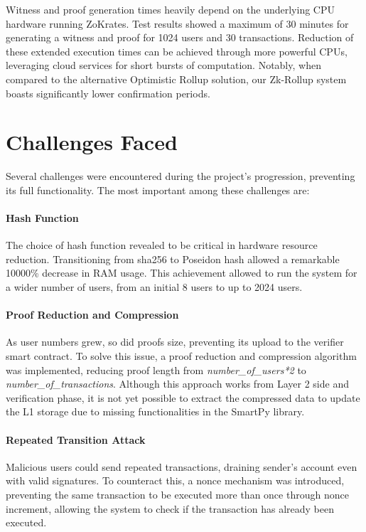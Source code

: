 Witness and proof generation times heavily depend on the underlying CPU hardware running ZoKrates. Test results showed a maximum of 30 minutes for generating a witness and proof for 1024 users and 30 transactions. Reduction of these extended execution times can be achieved through more powerful CPUs, leveraging cloud services for short bursts of computation. Notably, when compared to the alternative Optimistic Rollup solution, our Zk-Rollup system boasts significantly lower confirmation periods.

\section{Challenges Faced}

Several challenges were encountered during the project's progression, preventing its full functionality. The most important among these challenges are:
\vspace{-0.11in}
\paragraph{Hash Function} The choice of hash function revealed to be critical in hardware resource reduction. Transitioning from sha256 to Poseidon hash allowed a remarkable 10000\% decrease in RAM usage. This achievement allowed to run the system for a wider number of users, from an initial 8 users to up to 2024 users.
\vspace{-0.11in}
\paragraph{Proof Reduction and Compression} As user numbers grew, so did proofs size, preventing its upload to the verifier smart contract. To solve this issue, a proof reduction and compression algorithm was implemented, reducing proof length from \textit{number\_of\_users*2} to \textit{number\_of\_transactions}. Although this approach works from Layer 2 side and verification phase, it is not yet possible to extract the compressed data to update the L1 storage due to missing functionalities in the SmartPy library.
\vspace{-0.11in}
\paragraph{Repeated Transition Attack} Malicious users could send repeated transactions, draining sender's account even with valid signatures. To counteract this, a nonce mechanism was introduced, preventing the same transaction to be executed more than once through nonce increment, allowing the system to check if the transaction has already been executed.

